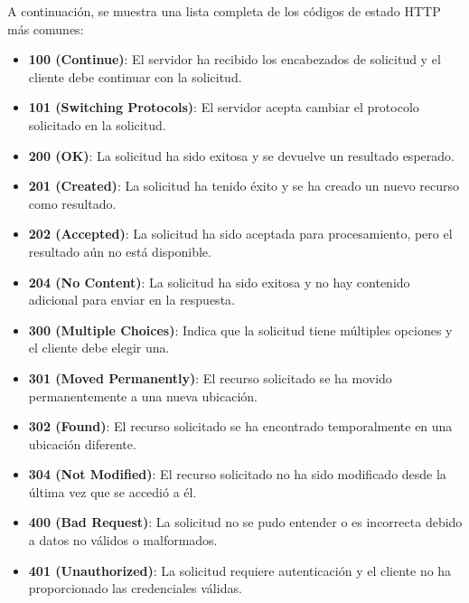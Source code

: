 \documentclass[executivepaper]{article}
\begin{document}
A continuación, se muestra una lista completa de los códigos de estado HTTP más comunes:

\begin{itemize}
    \item \textbf{100 (Continue)}: El servidor ha recibido los encabezados de solicitud y el cliente debe continuar con la solicitud.
    
    \item \textbf{101 (Switching Protocols)}: El servidor acepta cambiar el protocolo solicitado en la solicitud.
    
    \item \textbf{200 (OK)}: La solicitud ha sido exitosa y se devuelve un resultado esperado.
    
    \item \textbf{201 (Created)}: La solicitud ha tenido éxito y se ha creado un nuevo recurso como resultado.
    
    \item \textbf{202 (Accepted)}: La solicitud ha sido aceptada para procesamiento, pero el resultado aún no está disponible.
    
    \item \textbf{204 (No Content)}: La solicitud ha sido exitosa y no hay contenido adicional para enviar en la respuesta.
    
    \item \textbf{300 (Multiple Choices)}: Indica que la solicitud tiene múltiples opciones y el cliente debe elegir una.
    
    \item \textbf{301 (Moved Permanently)}: El recurso solicitado se ha movido permanentemente a una nueva ubicación.
    
    \item \textbf{302 (Found)}: El recurso solicitado se ha encontrado temporalmente en una ubicación diferente.
    
    \item \textbf{304 (Not Modified)}: El recurso solicitado no ha sido modificado desde la última vez que se accedió a él.
    
    \item \textbf{400 (Bad Request)}: La solicitud no se pudo entender o es incorrecta debido a datos no válidos o malformados.
    
    \item \textbf{401 (Unauthorized)}: La solicitud requiere autenticación y el cliente no ha proporcionado las credenciales válidas.
    

\end{itemize}
\end{document}
